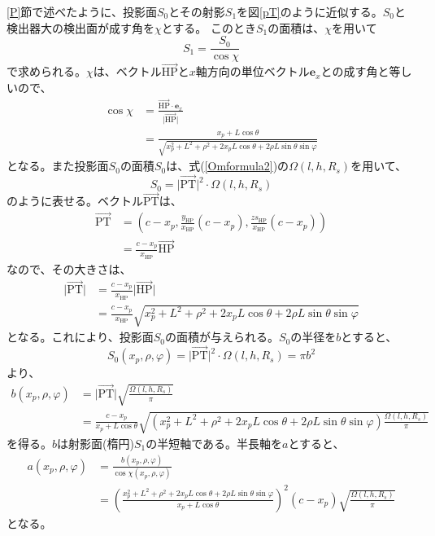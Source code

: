 \documentclass[11pt, titlepage, openany]{ltjsbook}
\begin{document}
\ref{P}節で述べたように、投影面$S_0$とその射影$S_1$を図\ref{pT}のように近似する。$S_0$と検出器大の検出面が成す角を$\chi$とする。
このとき$S_1$の面積は、$\chi$を用いて
\begin{equation}
    S_1 = \frac{S_0}{\cos\chi}
\end{equation}
で求められる。$\chi$は、ベクトル$\overrightarrow{\mathrm{HP}}$と$x$軸方向の単位ベクトル$\bm{e}_x$との成す角と等しいので、
\begin{align}
    \cos\chi & = \frac{\overrightarrow{\mathrm{HP}} \cdot \bm{e}_x}{\lvert \overrightarrow{\mathrm{HP}} \rvert}\\
    & = \frac{x_p + L\cos\theta}{\sqrt{x_p^2 + L^2 + \rho^2 + 2x_p L\cos\theta +2\rho L\sin\theta\sin\varphi}}
\end{align}
となる。また投影面$S_0$の面積$S_0$は、式(\ref{Omformula2})の$\Omega(l,h,R_s)$を用いて、
\begin{equation}
    S_0 = \lvert \overrightarrow{\mathrm{PT}} \rvert^2 \cdot \Omega(l,h,R_s)
\end{equation}
のように表せる。ベクトル$\overrightarrow{\mathrm{PT}}$は、
\begin{align}
    \overrightarrow{\mathrm{PT}}
    & = \left(c - x_p, \frac{y_{\mathrm{HP}}}{x_{\mathrm{HP}}}(c - x_p), \frac{zs_{\mathrm{HP}}}{x_{\mathrm{HP}}}(c - x_p) \right)\\
    & = \frac{c - x_p}{x_{\mathrm{HP}}} \overrightarrow{\mathrm{HP}}
\end{align}
なので、その大きさは、
\begin{align}
    \lvert \overrightarrow{\mathrm{PT}} \rvert
    & = \frac{c - x_p}{x_{\mathrm{HP}}} \lvert \overrightarrow{\mathrm{HP}} \rvert \\
    & = \frac{c - x_p}{x_{\mathrm{HP}}} \sqrt{ x_p^2 + L^2 + \rho^2 + 2x_p L\cos\theta +2\rho L\sin\theta\sin\varphi }
\end{align}
となる。これにより、投影面$S_0$の面積が与えられる。$S_0$の半径を$b$とすると、
\begin{equation}
    S_0(x_p, \rho, \varphi) = \lvert \overrightarrow{\mathrm{PT}} \rvert^2 \cdot \Omega(l, h, R_s) = \pi b^2
\end{equation}
より、
\begin{align}
    b(x_p, \rho, \varphi)
    & = \lvert \overrightarrow{\mathrm{PT}} \rvert \sqrt{\frac{\Omega(l, h, R_s)}{\pi}} \\
    & = \frac{c - x_p}{x_p + L\cos\theta} \sqrt{ (x_p^2 + L^2 + \rho^2 + 2x_p L\cos\theta +2\rho L\sin\theta\sin\varphi) \frac{\Omega(l, h, R_s)}{\pi}}
\end{align}
を得る。$b$は射影面(楕円)$S_1$の半短軸である。半長軸を$a$とすると、
\begin{align}
    a(x_p, \rho, \varphi)
    & = \frac{b(x_p, \rho, \varphi)}{\cos\chi(x_p, \rho, \varphi)} \\
    & = \left(\frac{x_p^2 + L^2 + \rho^2 + 2x_p L\cos\theta +2\rho L\sin\theta\sin\varphi}{x_p + L\cos\theta} \right)^2 (c - x_p) \sqrt{\frac{\Omega(l, h, R_s)}{\pi}}
\end{align}
となる。
\end{document}
